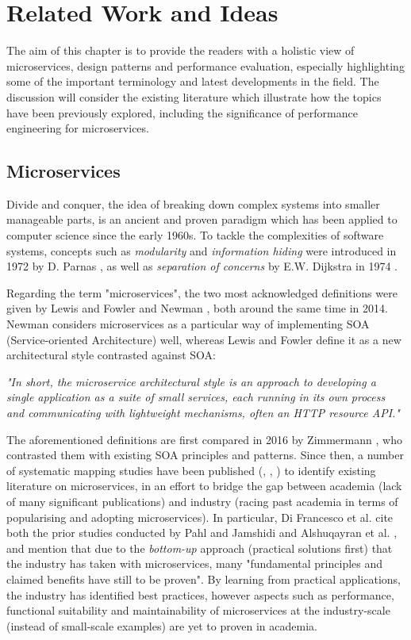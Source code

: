 \chapter{Related Work and Ideas}

The aim of this chapter is to provide the readers with a holistic view of microservices, design patterns and performance evaluation, especially highlighting some of the important terminology and latest developments in the field. The discussion will consider the existing literature which illustrate how the topics have been previously explored, including the significance of performance engineering for microservices.

\section{Microservices}

Divide and conquer, the idea of breaking down complex systems into smaller manageable parts, is an ancient and proven paradigm which has been applied to computer science since the early 1960s. To tackle the complexities of software systems, concepts such as \textit{modularity} and \textit{information hiding} were introduced in 1972 by D. Parnas \cite{parnas72}, as well as \textit{separation of concerns} by E.W. Dijkstra in 1974 \cite{dijkstra74}.

Regarding the term "microservices", the two most acknowledged definitions were given by Lewis and Fowler \cite{lewis14} and Newman \cite{newman14}, both around the same time in 2014. Newman considers microservices as a particular way of implementing SOA (Service-oriented Architecture) well, whereas Lewis and Fowler define it as a new architectural style contrasted against SOA:

\textit{"In short, the microservice architectural style is an approach to developing a single application as a suite of small services, each running in its own process and communicating with lightweight mechanisms, often an HTTP resource API."}

The aforementioned definitions are first compared in 2016 by Zimmermann \cite{zimmermann16}, who contrasted them with existing SOA principles and patterns. Since then, a number of systematic mapping studies have been published (\cite{pahl16}, \cite{alshuqayran16}, \cite{difrancesco19}) to identify existing literature on microservices, in an effort to bridge the gap between academia (lack of many significant publications) and industry (racing past academia in terms of popularising and adopting
microservices). In particular, Di Francesco et al. \cite{difrancesco19} cite both the prior studies conducted by Pahl and Jamshidi \cite{pahl16} and Alshuqayran et al. \cite{alshuqayran16}, and mention that due to the \textit{bottom-up} approach (practical solutions first) that the industry has taken with microservices, many "fundamental principles and claimed benefits have still to be proven". By learning from practical applications, the industry has identified best practices, however aspects such as performance, functional suitability and maintainability of microservices at the industry-scale (instead of small-scale examples) are yet to proven in academia.

